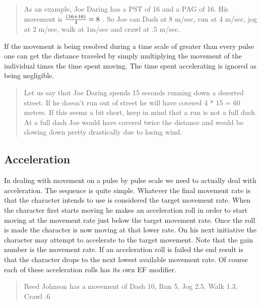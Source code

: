 \begin{quotation}
As an example, Joe Daring has a PST of 16 and a PAG of 16. His movement is
\( {{(16 + 16)} \over 4} = 8 \) . So Joe can Dash at 8 m/sec, run at 4 m/sec, jog
at 2 m/sec, walk at 1m/sec and crawl at .5 m/sec.
\end{quotation}

If the movement is being resolved during a time scale of greater than every
pulse one can get the distance traveled by simply multiplying the movement 
of the individual times the time spent moving. The time spent accelerating
is ignored as being negligible.

\begin{quotation}
Let us say that Joe Daring spends 15 seconds running down a deserted street.
If he doesn't run out of street he will have covered 4 * 15 = 60 meters. If 
this seems a bit short, keep in mind that a run is not a full dash. At a full
dash Joe would have covered twice the distance and would be slowing down pretty 
drastically due to losing wind.
\end{quotation}

\subsection{Acceleration}


In dealing with movement on a pulse by pulse scale we need to actually
deal with acceleration. The sequence is quite simple. Whatever the
final movement  rate is that the character intends to use is considered
the target movement rate. When the character first starts moving he
makes an acceleration roll in  order to start moving at the movement
rate just below the target movement rate. Once the roll is made the
character is now moving at that lower rate. On his next  initiative the
character may attempt to accelerate to the target movement. Note  that
the gain number is the movement rate. If an acceleration roll is failed
the end result is that the character drops to the next lowest available
movement  rate. Of course each of these acceleration rolls has its own
EF modifier.  



\begin{quotation}
Reed Johnson has a movement of Dash 10, Run 5, Jog 2.5, Walk 1.3, Crawl .6
\end{quotation}

